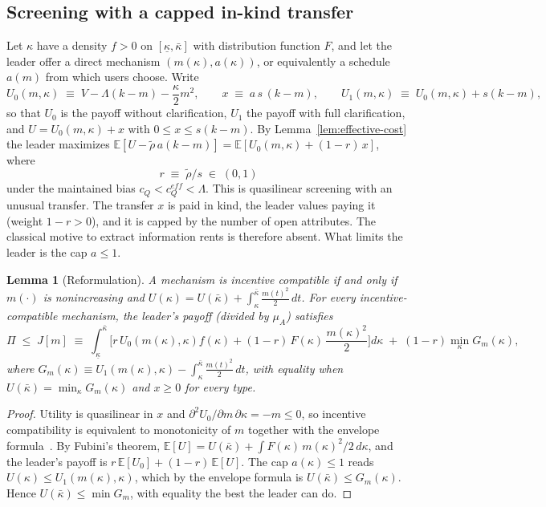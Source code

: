 \documentclass[11pt]{article}
\newtheorem{lemma}{Lemma}
\begin{document}
\subsection{Screening with a capped in-kind transfer}

Let $\kappa$ have a density $f > 0$ on $[\underline\kappa, \bar\kappa]$ with distribution function $F$, and let the leader offer a direct mechanism $(m(\kappa), a(\kappa))$, or equivalently a schedule $a(m)$ from which users choose. Write
\[
U_0(m,\kappa) \;\equiv\; V - \Lambda(k-m) - \frac{\kappa}{2}m^2, \qquad x \;\equiv\; a\,s\,(k-m), \qquad U_1(m,\kappa) \;\equiv\; U_0(m,\kappa) + s(k-m),
\]
so that $U_0$ is the payoff without clarification, $U_1$ the payoff with full clarification, and $U = U_0(m,\kappa) + x$ with $0 \le x \le s(k-m)$. By Lemma~\ref{lem:effective-cost} the leader maximizes $\mathbb{E}[U - \tilde\rho\,a(k-m)] = \mathbb{E}[U_0(m,\kappa) + (1-r)\,x]$, where
\[
r \;\equiv\; \tilde\rho / s \;\in\; (0,1)
\]
under the maintained bias $c_Q < c_Q^{eff} < \Lambda$. This is quasilinear screening with an unusual transfer. The transfer $x$ is paid in kind, the leader values paying it (weight $1 - r > 0$), and it is capped by the number of open attributes. The classical motive to extract information rents is therefore absent. What limits the leader is the cap $a \le 1$.

\begin{lemma}[Reformulation]
\label{lem:continuum}
A mechanism is incentive compatible if and only if $m(\cdot)$ is nonincreasing and $U(\kappa) = U(\bar\kappa) + \int_\kappa^{\bar\kappa} \frac{m(t)^2}{2}\,dt$. For every incentive-compatible mechanism, the leader's payoff (divided by $\mu_A$) satisfies
\[
\Pi \;\le\; J[m] \;\equiv\; \int_{\underline\kappa}^{\bar\kappa} \Big[ r\, U_0(m(\kappa),\kappa) f(\kappa) + (1-r)\, F(\kappa)\, \frac{m(\kappa)^2}{2} \Big] d\kappa \;+\; (1-r) \min_{\kappa} G_m(\kappa),
\]
where $G_m(\kappa) \equiv U_1(m(\kappa),\kappa) - \int_\kappa^{\bar\kappa} \frac{m(t)^2}{2}\,dt$, with equality when $U(\bar\kappa) = \min_\kappa G_m(\kappa)$ and $x \ge 0$ for every type.
\end{lemma}

\begin{proof}
Utility is quasilinear in $x$ and $\partial^2 U_0/\partial m\,\partial\kappa = -m \le 0$, so incentive compatibility is equivalent to monotonicity of $m$ together with the envelope formula~\citep{mirrlees1971,myerson1981,milgrom-segal2002}. By Fubini's theorem, $\mathbb{E}[U] = U(\bar\kappa) + \int F(\kappa)\, m(\kappa)^2/2\, d\kappa$, and the leader's payoff is $r\,\mathbb{E}[U_0] + (1-r)\,\mathbb{E}[U]$. The cap $a(\kappa) \le 1$ reads $U(\kappa) \le U_1(m(\kappa),\kappa)$, which by the envelope formula is $U(\bar\kappa) \le G_m(\kappa)$. Hence $U(\bar\kappa) \le \min G_m$, with equality the best the leader can do.
\end{proof}
\end{document}
